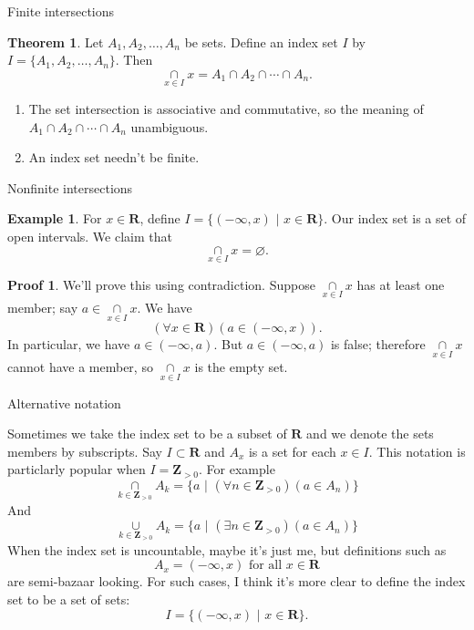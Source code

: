 \documentclass[fleqn]{beamer}
\newcommand{\reals}{\mathbf{R}}
\newcommand{\integers}{\mathbf{Z}}
\theoremstyle{definition}
\newtheorem{myex}{Example}
\newtheorem{myth}{Theorem}
\newtheorem{myproof}{Proof}
\begin{document}
\begin{frame}{Finite intersections}
\begin{myth} Let \(A_1, A_2, \dots, A_n\) be sets.  Define an index set \(I\) by  \(I = \{A_1, A_2, \dots, A_n \} \). Then
\[
   \underset{x \in I}{\cap} x = A_1 \cap A_2 \cap  \cdots \cap A_n.
\]
\end{myth}
\begin{enumerate}
  \item The set intersection  is associative and commutative, so  the meaning of \(A_1 \cap A_2 \cap \cdots \cap A_n \) unambiguous. 
  
  \item An index set needn't be finite.
\end{enumerate}
\end{frame}

\begin{frame}{Nonfinite intersections}

\begin{myex}  For \(x \in \reals\), define \( I = \{ (-\infty, x) \,\, | \,\, x \in \reals \} \). Our index set is a set of open intervals. 
We claim that
\[
    \underset{x \in I}{\cap} x  = \varnothing.
\]
\end{myex} 

\begin{myproof}   We'll prove this using contradiction.  Suppose  \( \underset{x \in I}{\cap} x \) has at least one member; say \(a \in  \underset{x \in I}{\cap} x \). We have 
\[
    (\forall x \in \reals)(a \in (-\infty, x)).
\]
In particular, we have \(a \in (-\infty, a)\).  But \(a \in (-\infty, a)\) is false; therefore \( \underset{x \in I}{\cap} x \) cannot have a member, so \( \underset{x \in I}{\cap} x \)  is the empty set.
\end{myproof}



\end{frame}

\begin{frame}{Alternative notation}

Sometimes we take the index set to be a subset of \(\reals\) and we denote the sets members by subscripts. Say \(I \subset \reals\) and  \(A_x\) is a set for each \(x \in I\).  This notation is particlarly
popular when \(I = \integers_{> 0}\).  For example
\[
  \underset{k  \in \integers_{> 0}} {\cap} A_k   = \{ a \,\, | \,\, (\forall n \in  \integers_{> 0})(a \in A_n) \}
\]
And 
\[
  \underset{k  \in \integers_{> 0}} {\cup} A_k   = \{ a \,\, | \,\, (\exists  n \in  \integers_{> 0})(a \in A_n) \}
\]
When the index set is uncountable, maybe it's just me, but definitions such as
\[
   A_x = (-\infty, x)   \mbox{  for all } x \in \reals
\]
are semi-bazaar looking. For such cases, I think it's more clear to define the index set to be a set of sets:
\[
   I  =  \{ (-\infty, x)   \,\, | \,\, x \in \reals\}.
\]


\end{frame}
\end{document}
